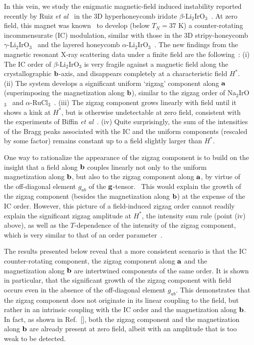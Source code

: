 \documentclass[prx,aps,groupedaddress,twocolumn]{revtex4-1}
\begin{document}
In this vein, we study the enigmatic magnetic-field induced instability reported recently by Ruiz {\it et al}~\cite{Ruiz2017} in the 3D hyperhoneycomb iridate $\beta$-Li$_2$IrO$_3$~\cite{Takayama2015,Biffin2014a}. 
%
At zero field, this magnet was known~\cite{Biffin2014a} to develop (below $T_N\!=\!37$ K) a counter-rotating incommensurate (IC) modulation, similar with those in the 3D stripy-honeycomb $\gamma$-Li$_2$IrO$_3$~\cite{Biffin2014b,Modic2014} and the layered honeycomb $\alpha$-Li$_2$IrO$_3$~\cite{Williams2016}.
%
The new findings from the magnetic resonant X-ray scattering data under a finite field are the following~\cite{Ruiz2017}:
%
(i) The IC order of $\beta$-Li$_2$IrO$_3$ is very fragile against a magnetic field along the crystallographic ${\bf b}$-axis, and disappears completely at a characteristic field $H^\ast$.  
%
(ii) The system develops a significant uniform `zigzag' component along ${\bf a}$ (superimposing the magnetization along ${\bf b}$), similar to the zigzag order of Na$_2$IrO$_3$~\cite{Singh2010,Singh2012,Liu2011,Choi2012,Ye2012,Chun2015} and $\alpha$-RuCl$_3$~\cite{Plumb2014,Sears2015,Kubota2015,Majumder2015,Banerjee2016, Johnson2015}.
%
(iii) The zigzag component grows linearly with field until it shows a kink at $H^\ast$, but is otherwise undetectable at zero field, consistent with the experiments of Biffin {\it et al}~\cite{Biffin2014a}. 
%
(iv) Quite surprisingly, the sum of the intensities of the Bragg peaks associated with the IC and the uniform components (rescaled by some factor) remains constant up to a field slightly larger than $H^\ast$.

One way to rationalize the appearance of the zigzag component is to build on the insight that a field along ${\bf b}$ couples linearly not only to the uniform magnetization along ${\bf b}$, but also to the zigzag component along ${\bf a}$, by virtue of the off-diagonal element $g_{ab}$ of the ${\bf g}$-tensor.~\cite{Ruiz2017}  This would explain the growth of the zigzag component (besides the magnetization along ${\bf b}$) at the expense of the IC order. However, this picture of a field-induced zigzag order cannot readily explain the significant zigzag amplitude at $H^\ast$, the intensity sum rule (point (iv) above), as well as the $T$-dependence of the intensity of the zigzag component, which is very similar to that of an order parameter~\cite{Ruiz2017}. 


The results presented below reveal that a more consistent scenario is that the IC counter-rotating component, the zigzag component along ${\bf a}$ and the magnetization along ${\bf b}$ are intertwined components of the same order.  
%
It is shown in particular, that the significant growth of the zigzag component with field occurs even in the absence of the off-diagonal element $g_{ab}$. This demonstrates that the zigzag component does not originate in its linear coupling to the field, but rather in an intrinsic coupling with the IC order and the magnetization along ${\bf b}$. 
%
In fact, as shown in Ref.~[], both the zigzag component and the magnetization along ${\bf b}$ are already present at zero field, albeit with an amplitude that is too weak to be detected. 
\end{document}
